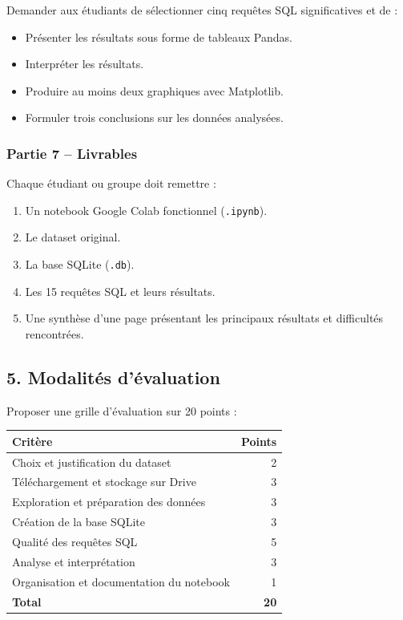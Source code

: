 \documentclass[
]{article}
\providecommand{\tightlist}{%
  \setlength{\itemsep}{0pt}\setlength{\parskip}{0pt}}
\begin{document}
Demander aux étudiants de sélectionner cinq requêtes SQL significatives
et de :

\begin{itemize}
\tightlist
\item
  Présenter les résultats sous forme de tableaux Pandas.
\item
  Interpréter les résultats.
\item
  Produire au moins deux graphiques avec Matplotlib.
\item
  Formuler trois conclusions sur les données analysées.
\end{itemize}

\subsubsection{Partie 7 -- Livrables}\label{partie-7-livrables}

Chaque étudiant ou groupe doit remettre :

\begin{enumerate}
\def\labelenumi{\arabic{enumi}.}
\tightlist
\item
  Un notebook Google Colab fonctionnel (\texttt{.ipynb}).
\item
  Le dataset original.
\item
  La base SQLite (\texttt{.db}).
\item
  Les 15 requêtes SQL et leurs résultats.
\item
  Une synthèse d'une page présentant les principaux résultats et
  difficultés rencontrées.
\end{enumerate}

\subsection{5. Modalités
d'évaluation}\label{modalituxe9s-duxe9valuation}

Proposer une grille d'évaluation sur 20 points :

\begin{longtable}[]{@{}lr@{}}
\toprule\noalign{}
Critère & Points \\
\midrule\noalign{}
\endhead
\bottomrule\noalign{}
\endlastfoot
Choix et justification du dataset & 2 \\
Téléchargement et stockage sur Drive & 3 \\
Exploration et préparation des données & 3 \\
Création de la base SQLite & 3 \\
Qualité des requêtes SQL & 5 \\
Analyse et interprétation & 3 \\
Organisation et documentation du notebook & 1 \\
\textbf{Total} & \textbf{20} \\
\end{longtable}
\end{document}
